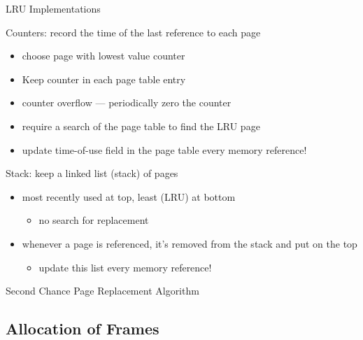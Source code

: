 \begin{frame}{LRU Implementations}
  \begin{iblock}{\alert{Counters}: record the time of the last reference
      to each page}
    \begin{itemize}
    \item choose page with lowest value counter
    \item Keep counter in each page table entry
    \item counter overflow --- periodically zero the counter
    \item require a \alert{search} of the page table to find the LRU page
    \item update time-of-use field in the page table \alert{every memory reference!}
    \end{itemize}
  \end{iblock}
  \begin{iblock}{\alert{Stack}: keep a linked list (stack) of pages}
    \begin{itemize}
    \item most recently used at top, least (LRU) at bottom
      \begin{itemize}
      \item no search for replacement
      \end{itemize}
    \item whenever a page is referenced, it's removed from the stack and put on the top
      \begin{itemize}
      \item update this list \alert{every memory reference!}
      \end{itemize}
    \end{itemize}
  \end{iblock}
\end{frame}

\begin{frame}{Second Chance Page Replacement Algorithm}
  \begin{center}
  \end{center}
\end{frame}

\subsection{Allocation of Frames}

